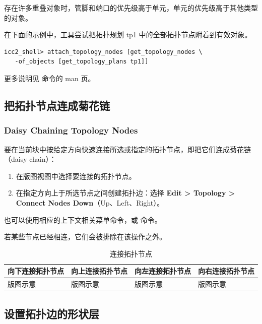 存在许多重叠对象时，管脚和端口的优先级高于单元，单元的优先级高于其他类型的对象。

在下面的示例中，工具尝试把拓扑规划 tp1 中的全部拓扑节点附着到有效对象。
\begin{lstlisting}
icc2_shell> attach_topology_nodes [get_topology_nodes \
   -of_objects [get_topology_plans tp1]]
\end{lstlisting}

\begin{seeAlsoBox}
更多说明见  命令的 man 页。
\end{seeAlsoBox}

\subsection{把拓扑节点连成菊花链}
\subsubsection*{Daisy Chaining Topology Nodes}

要在当前块中按给定方向快速连接所选或指定的拓扑节点，即把它们连成菊花链（daisy chain）：
\begin{enumerate}
  \item 在版图视图中选择要连接的拓扑节点。
  \item 在指定方向上于所选节点之间创建拓扑边：选择 \textbf{Edit > Topology > Connect Nodes Down}（Up、Left、Right）。
\end{enumerate}

也可以使用相应的上下文相关菜单命令，或  命令。

\begin{noteBox}
若某些节点已经相连，它们会被排除在该操作之外。
\end{noteBox}

\begin{table}[htbp]
\centering
\caption{连接拓扑节点}
\label{tab:gui-dp-connect}
\begin{tabularx}{\textwidth}{@{}XXXX@{}}
\toprule
向下连接拓扑节点 & 向上连接拓扑节点 & 向左连接拓扑节点 & 向右连接拓扑节点 \\
\midrule
版图示意 & 版图示意 & 版图示意 & 版图示意 \\
\bottomrule
\end{tabularx}
\end{table}

\subsection{设置拓扑边的形状层}
